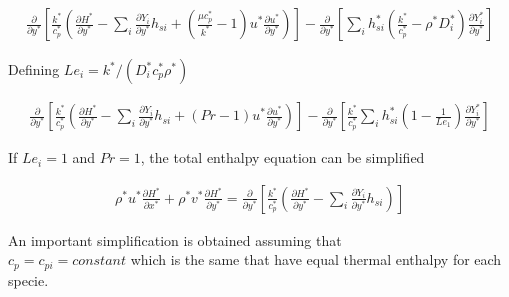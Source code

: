 \begin{equation*} 
\begin{split} 
 \frac{\partial}{\partial y^*}
\left[
    \frac{k^*}{c_p^*}
    \left(
    \frac{\partial H^*}{\partial y^*}
    -
    \sum_i
    \frac{\partial Y_i}{\partial y^*}
    h_{si}
    +
    \left(
    \frac{\mu c_p^*}{k^*}   
    -
    1
    \right)
    u^*
    \frac{\partial u^*}{\partial y^*}
    \right)
\right]
-
\frac{\partial}{\partial y^*}
    \left[
        \sum_i
        h_{si}^*
        \left(
            \frac{k^*}{c_p^*} 
            -
            \rho^* 
            D_i^*
        \right)
        \frac{\partial Y^*_i}{\partial y^*}
    \right]
\end{split} 
\end{equation*} 

Defining 
$Le_i=k^*/(D_i^*c_p^* \rho^*)$

\begin{equation*} 
\begin{split} 
\frac{\partial}{\partial y^*}
\left[
    \frac{ k^*}{c_p^*} 
    \left(
    \frac{\partial H^*}{\partial y^*}
    -
    \sum_i
    \frac{\partial Y_i}{\partial y^*}
    h_{si}
    +
    \left(
    Pr
    -
    1
    \right)
    u^*
    \frac{\partial u^*}{\partial y^*}
    \right)
\right]
-
\frac{\partial}{\partial y^*}
    \left[
    \frac{k^*}{c_p^*} 
        \sum_i
        h_{si}^*
        \left(
            1
            -
            \frac{1}{Le_1} 
        \right)
        \frac{\partial Y^*_i}{\partial y^*}
    \right]
\end{split} 
\end{equation*} 

If $Le_i=1$ and $Pr=1$, the total enthalpy equation can be simplified 

\begin{equation} 
\begin{split} 
\rho^* u^* \frac{\partial H^*}{\partial x^*}
+
\rho^* v^* \frac{\partial H^*}{\partial y^*}
=
\frac{\partial}{\partial y^*}
\left[
    \frac{ k^*}{c_p^*} 
    \left(
        \frac{\partial H^*}{\partial y^*}
        -
        \sum_i
        \frac{\partial Y_i}{\partial y^*}
        h_{si}
    \right)
\right]
\end{split} 
\end{equation} 

An important simplification is obtained 
assuming that  \\ $c_p=c_{pi}=constant$ which is the 
same that have equal thermal enthalpy for each specie.

